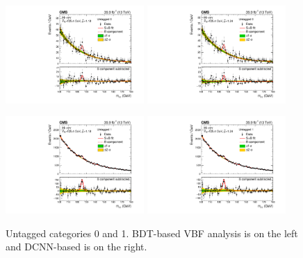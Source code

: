 \begin{figure}[h!]
    \begin{center}
        \includegraphics[width=0.47\textwidth]{figures/appendix_mass_plots/CMS-HIG-16-040_Figure_011-a.pdf}
        \includegraphics[width=0.47\textwidth]{figures/appendix_mass_plots/SBplots_jackWSnewOldTTHUntaggedTag_0_13TeV.pdf}
    \end{center}
    \begin{center}
        \includegraphics[width=0.47\textwidth]{figures/appendix_mass_plots/CMS-HIG-16-040_Figure_011-b.pdf}
        \includegraphics[width=0.47\textwidth]{figures/appendix_mass_plots/SBplots_jackWSnewOldTTHUntaggedTag_1_13TeV.pdf}
    \end{center}
    \caption{Untagged categories 0 and 1. BDT-based VBF analysis is on the left and DCNN-based is on the right.}
        \label{fig:app_mass_plots:unt_0_1}
\end{figure}

